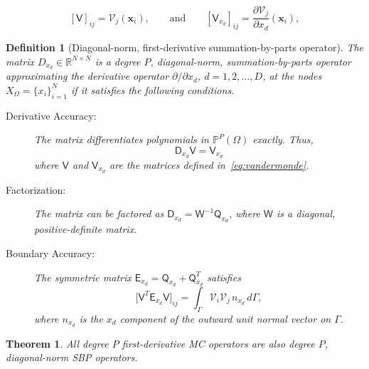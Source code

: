 \documentclass[10pt,a4paper]{amsart}
\newtheorem{definition}{Definition}
\newtheorem{theorem}{Theorem}
\newcommand{\fnc}[1]{\ensuremath{\mathcal{#1}}}
\newcommand{\mat}[1]{\ensuremath{\mathsf{#1}}}
\begin{document}
\begin{equation}\label{eq:vandermonde}
    [\mat{V}]_{ij} = \fnc{V}_{j}(\bm{x}_i), \qquad 
    \text{and}\qquad 
    [\mat{V}_{x_d}]_{ij} = \frac{\partial \fnc{V}_{j}}{\partial x_d}(\bm{x}_i),
\end{equation}

\begin{definition}[Diagonal-norm, first-derivative summation-by-parts operator]\label{def:sbp}
The matrix $D_{x_d} \in \mathbb{R}^{N\times N}$ is a degree $P$, diagonal-norm, summation-by-parts operator approximating the derivative operator $\partial/\partial x_d$, $d=1,2,\ldots,D$, at the nodes $X_{\Omega} = \{x_{i}\}_{i=1}^{N}$ if it satisfies the following conditions.
\begin{description}
    \item[Derivative Accuracy:] The matrix differentiates polynomials in $\mathbb{P}^P(\Omega)$ exactly.  Thus,
    \begin{equation}\label{eq:sbp_accuracy}
        \mat{D}_{x_d} \mat{V} = \mat{V}_{x_d}
    \end{equation}
    where $\mat{V}$ and $\mat{V}_{x_d}$ are the matrices defined in~\eqref{eq:vandermonde}.
    \item[Factorization:] The matrix can be factored as $\mat{D}_{x_d} = \mat{W}^{-1} \mat{Q}_{x_d}$, where $\mat{W}$ is a diagonal, positive-definite matrix.
    \item[Boundary Accuracy:] The symmetric matrix $\mat{E}_{x_d} = \mat{Q}_{x_d} + \mat{Q}_{x_d}^{T}$ satisfies
    \begin{equation}\label{eq:sbp_boundary}
    \big[ \mat{V}^T \mat{E}_{x_d} \mat{V} \big]_{ij} = \int_{\Gamma} \fnc{V}_i \fnc{V}_j \, n_{x_d}\, d\Gamma,
    \end{equation}
    where $n_{x_d}$ is the $x_{d}$ component of the outward unit normal vector on $\Gamma$.
\end{description}
\end{definition}

\begin{theorem}\label{thm:mc_are_sbp}
All degree $P$ first-derivative MC operators are also degree $P$, diagonal-norm SBP operators.
\end{theorem}
\end{document}

